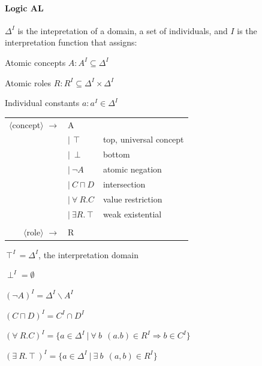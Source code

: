 \documentclass[10pt]{report}
\begin{document}
\paragraph{Logic AL} $\Delta^I$ is the intepretation of a domain, a set of individuals, and $I$ is the interpretation function that assigns:
\begin{list}{}{}
	\item Atomic concepts $A:A^I\subseteq \Delta^I$
	\item Atomic roles $R:R^I\subseteq \Delta^I\times\Delta^I$
	\item Individual constants $a:a^I\in\Delta^I$
\end{list}
\begin{multicols}{2}
\begin{center}
	\begin{tabular}{r l l}
	$\langle$concept$\rangle$ $\rightarrow$ & A\\
	& $|\:\intercal$ & top, universal concept\\
	& $|\:\perp$ & bottom\\
	& $|\:\neg A$ & atomic negation\\
	& $|\:C\sqcap D$ & intersection\\
	& $|\:\forall\:R.C$ & value restriction\\
	& $|\:\exists R.\intercal$ & weak existential\\
	\\
	$\langle$role$\rangle$ $\rightarrow$ & R
	\end{tabular}
\end{center}
\columnbreak
\begin{list}{}{}
	\item $\intercal^I = \Delta^I$, the interpretation domain
	\item $\perp^I = \emptyset$
	\item $(\neg A)^I = \Delta^I\smallsetminus A^I$
	\item $(C\sqcap D)^I = C^I\cap D^I$
	\item $(\forall\:R.C)^I = \{a\in\Delta^I\:|\:\forall\:b\:\:(a.b)\in R^I \Rightarrow b\in C^I\}$
	\item $(\exists\:R.\intercal)^I = \{a\in\Delta^I\:|\:\exists\:b\:\:(a,b)\in R^I\}$
\end{list}
\end{multicols}
\end{document}
